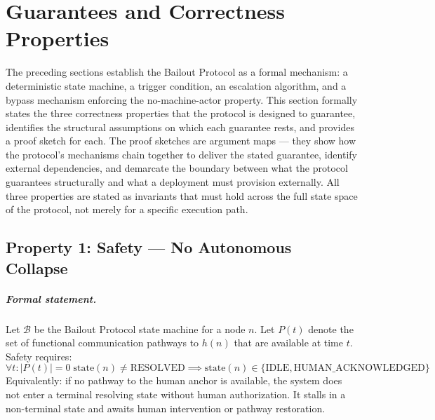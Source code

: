 \section{Guarantees and Correctness Properties}
\label{sec:correctness-properties}

The preceding sections establish the Bailout Protocol as a formal mechanism: a deterministic state machine, a trigger condition, an escalation algorithm, and a bypass mechanism enforcing the no-machine-actor property. This section formally states the three correctness properties that the protocol is designed to guarantee, identifies the structural assumptions on which each guarantee rests, and provides a proof sketch for each. The proof sketches are argument maps — they show how the protocol's mechanisms chain together to deliver the stated guarantee, identify external dependencies, and demarcate the boundary between what the protocol guarantees structurally and what a deployment must provision externally. All three properties are stated as invariants that must hold across the full state space of the protocol, not merely for a specific execution path.

\subsection{Property 1: Safety — No Autonomous Collapse}


\subparagraph{Formal statement.} Let $\mathcal{B}$ be the Bailout Protocol state machine for a node $n$. Let $P(t)$ denote the set of functional communication pathways to $h(n)$ that are available at time $t$. Safety requires:
\begin{equation}
\forall t : |P(t)| = 0 \; \text{state}(n) \neq \text{RESOLVED} \implies \text{state}(n) \in \{\text{IDLE}, \text{HUMAN\_ACKNOWLEDGED}\}
\end{equation}
Equivalently: if no pathway to the human anchor is available, the system does not enter a terminal resolving state without human authorization. It stalls in a non-terminal state and awaits human intervention or pathway restoration.

